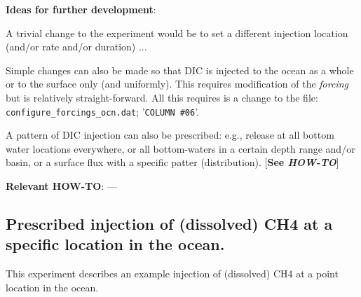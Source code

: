 \documentclass[10pt,twoside]{article}
\begin{document}
\noindent \textbf{Ideas for further development}:
\begin{compactenum}
	\item A trivial change to the experiment would be to set a different injection location (and/or rate and/or duration) ...
		\item Simple changes can also be made so that DIC is injected to the ocean as a whole or to the surface only (and uniformly). This requires modification of the \textit{forcing} but is relatively straight-forward. All this requires is a change to the file: \texttt{configure\_forcings\_ocn.dat}; '\texttt{COLUMN \#06}'.
				\item A pattern of DIC injection can also be prescribed: e.g., release at all bottom water locations everywhere, or all bottom-waters in a certain depth range and/or basin, or a surface flux with a specific patter (distribution). [\textbf{See \textit{HOW-TO}}]
\end{compactenum}

\noindent \textbf{Relevant HOW-TO}: ---



\subsection{Prescribed injection of (dissolved) CH4 at a specific location in the ocean.}\label{EXAMPLE_worjh2_PO4Fe_CH4INJECTION}

This experiment describes an example injection of (dissolved) CH4 at a point location in the ocean.
\end{document}
